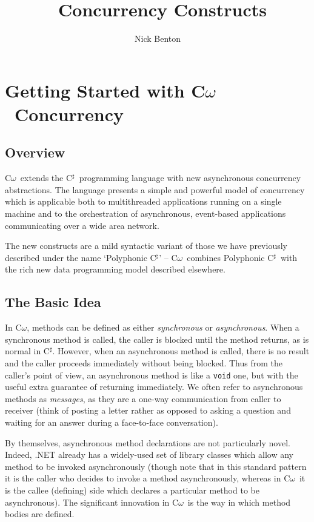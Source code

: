 \documentclass{article}
\title{\comega\ Concurrency Constructs}
\author{Nick Benton}
\newcommand{\comega}{\mbox{C$\omega$}}
\newcommand{\csharp}{\mbox{C$^\sharp$}}
\begin{document}
\maketitle
\section{Getting Started with \comega\ Concurrency}

\subsection{Overview}
\comega\ extends the \csharp\ programming language with new
asynchronous concurrency abstractions. The language presents a simple
and powerful model of concurrency which is applicable both to
multithreaded applications running on a single machine and to the
orchestration of asynchronous, event-based applications communicating
over a wide area network.

The new constructs are a mild syntactic variant of those we have
previously described under the name `Polyphonic \csharp'
\cite{polyphony:ecoop} -- \comega\ combines Polyphonic \csharp\ with
the rich new data programming model described elsewhere.


\subsection{The Basic Idea}
In \comega, methods can be defined as either \emph{synchronous} or
\emph{asynchronous}. When a synchronous method is called, the caller
is blocked until the method returns, as is normal in \csharp. However,
when an asynchronous method is called, there is no result and the
caller proceeds immediately without being blocked. Thus from the
caller's point of view, an asynchronous method is like a \verb|void| one, but
with the useful extra guarantee of returning immediately. We often
refer to asynchronous methods as \emph{messages}, as they are a
one-way communication from caller to receiver (think of posting a
letter rather as opposed to asking a question and waiting for an
answer during a face-to-face conversation).

By themselves, asynchronous method declarations are not particularly
novel. Indeed, .NET already has a widely-used set of library classes
which allow any method to be invoked asynchronously (though note that
in this standard pattern it is the caller who decides to invoke a
method asynchronously, whereas in \comega\ it is the callee
(defining) side which declares a particular method to be
asynchronous). The significant innovation in \comega\ is the way
in which method bodies are defined.
\end{document}
